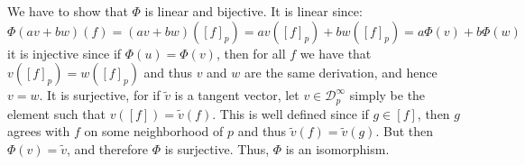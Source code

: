 \documentclass{article}                                                        %
\begin{document}
            \begin{solution}
                We have to show that $\Phi$ is linear and bijective. It is
                linear since:
                \begin{equation}
                    \Phi(av+bw)(f)=(av+bw)([f]_{p})
                        =av([f]_{p})+bw([f]_{p})
                        =a\Phi(v)+b\Phi(w)
                \end{equation}
                it is injective since if $\Phi(u)=\Phi(v)$, then for all
                $f$ we have that $v([f]_{p})=w([f]_{p})$ and thus $v$ and $w$
                are the same derivation, and hence $v=w$. It is surjective, for
                if $\tilde{v}$ is a tangent vector, let
                $v\in\mathcal{D}_{p}^{\infty}$ simply be the element such that
                $v([f])=\tilde{v}(f)$. This is well defined since if
                $g\in[f]$, then $g$ agrees with $f$ on some neighborhood of
                $p$ and thus $\tilde{v}(f)=\tilde{v}(g)$. But then
                $\Phi(v)=\tilde{v}$, and therefore $\Phi$ is surjective. Thus,
                $\Phi$ is an isomorphism.
            \end{solution}
\end{document}
